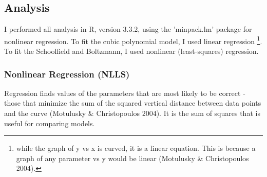 \documentclass[11pt]{article}
\begin{document}
\subsection*{Analysis}
I performed all analysis in R, version 3.3.2, using the 'minpack.lm' package for nonlinear regression.
To fit the cubic polynomial model, I used linear regression
\footnote{while the graph of y vs x is curved, it is a linear equation. This is because a graph of any parameter vs y would be linear (Motulusky \& Christopoulos 2004).}.
To fit the Schoolfield and Boltzmann, I used nonlinear (least-squares) regression.


\subsubsection*{Nonlinear Regression (NLLS)}


Regression finds values of the parameters that are most likely to be correct - those that minimize the sum of the squared vertical distance between data points and the curve (Motulusky \& Christopoulos 2004). It is the sum of squares that is useful for comparing models.

\end{document}
